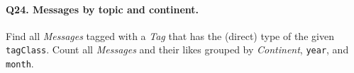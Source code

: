 \paragraph{\textbf{Q24}. Messages by topic and continent.}
Find all \emph{Messages} tagged with a \emph{Tag} that has the (direct)
type of the given \texttt{tagClass}.
Count all \emph{Messages} and their likes grouped by \emph{Continent},
\texttt{year}, and \texttt{month}.
